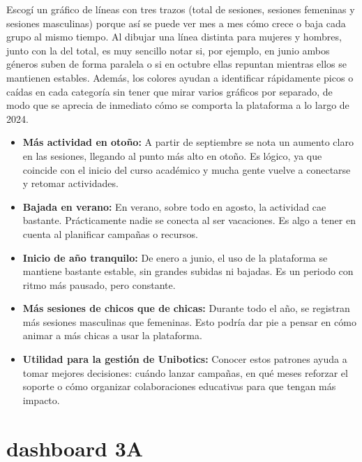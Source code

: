 \documentclass[a4paper, 12pt]{book}
\begin{document}
Escogí un gráfico de líneas con tres trazos (total de sesiones, sesiones femeninas y sesiones masculinas) porque así se puede ver mes a mes cómo crece o baja cada grupo al mismo tiempo. Al dibujar una línea distinta para mujeres y hombres, junto con la del total, es muy sencillo notar si, por ejemplo, en junio ambos géneros suben de forma paralela o si en octubre ellas repuntan mientras ellos se mantienen estables. Además, los colores ayudan a identificar rápidamente picos o caídas en cada categoría sin tener que mirar varios gráficos por separado, de modo que se aprecia de inmediato cómo se comporta la plataforma a lo largo de 2024.

\begin{itemize}

  \item \textbf{Más actividad en otoño:} A partir de septiembre se nota un aumento claro en las sesiones, llegando al punto más alto en otoño. Es lógico, ya que coincide con el inicio del curso académico y mucha gente vuelve a conectarse y retomar actividades.

  \item \textbf{Bajada en verano:} En verano, sobre todo en agosto, la actividad cae bastante. Prácticamente nadie se conecta al ser vacaciones. Es algo a tener en cuenta al planificar campañas o recursos.

  \item \textbf{Inicio de año tranquilo:} De enero a junio, el uso de la plataforma se mantiene bastante estable, sin grandes subidas ni bajadas. Es un periodo con ritmo más pausado, pero constante.

  \item \textbf{Más sesiones de chicos que de chicas:} Durante todo el año, se registran más sesiones masculinas que femeninas. Esto podría dar pie a pensar en cómo animar a más chicas a usar la plataforma.

  \item \textbf{Utilidad para la gestión de Unibotics:} Conocer estos patrones ayuda a tomar mejores decisiones: cuándo lanzar campañas, en qué meses reforzar el soporte o cómo organizar colaboraciones educativas para que tengan más impacto.

\end{itemize}



\section{dashboard 3A}
\end{document}
